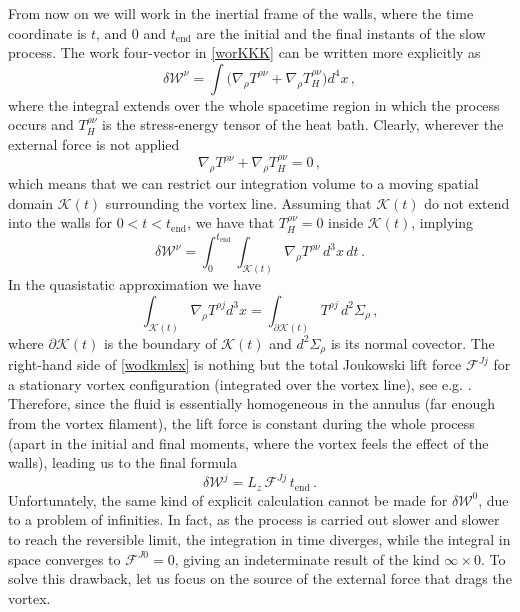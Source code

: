 \documentclass[preprints,article,accept,moreauthors,pdftex]{mdpi}
\begin{document}
From now on we will work in the inertial frame of the walls, where the time coordinate is $t$, 
and  $0$ and $t_{\text{end}}$ are the initial and the final instants of the slow process.
The work four-vector in  \eqref{worKKK} can be written more explicitly as
\begin{equation}
\delta \mathcal{W}^\nu = \int \bigg( \nabla_\rho T^{\rho \nu}+ \nabla_\rho T^{\rho \nu}_H \bigg) d^4 x
\, ,
\end{equation}
where the integral extends over the whole spacetime region in which the process occurs and $T^{\rho \nu}_H$ is the stress-energy tensor of the heat bath. 
Clearly, wherever the external force is not applied
\begin{equation}
\nabla_\rho T^{\rho \nu}+ \nabla_\rho T^{\rho \nu}_H  =0 \, ,
\end{equation}
which means that we can restrict our integration volume to a moving spatial domain $\mathcal{K}(t)$ surrounding the vortex line. 
Assuming that $\mathcal{K}(t)$ do not extend into the walls for $0<t<t_{\text{end}}$, we have that $T^{\rho \nu}_H=0$ inside $\mathcal{K}(t)$, implying
\begin{equation}
\delta \mathcal{W}^\nu = \int_0^{t_{\text{end}}} \int_{\mathcal{K}(t)} \nabla_\rho T^{\rho \nu}
\,  d^3 x \, dt \, . 
\end{equation}
In the quasistatic approximation we have
\begin{equation}\label{wodkmlsx}
\int_{\mathcal{K}(t)} \nabla_\rho T^{\rho j} d^3 x = \int_{\partial \mathcal{K}(t)}  T^{\rho j} 
\, d^2 \Sigma_\rho \, ,
\end{equation} 
where $\partial \mathcal{K}(t)$ is the boundary of $\mathcal{K}(t)$ and $d^2 \Sigma_\rho$ is its normal covector.  
The right-hand side of \eqref{wodkmlsx} is nothing but the total  Joukowski lift force $\mathcal{F}^{Jj}$ for a stationary vortex configuration (integrated over the vortex line), see e.g. \cite{Carter_Prix_Magnus}. 
Therefore, since the fluid is essentially homogeneous in the annulus (far enough from the vortex filament), the lift force is constant during the whole process (apart in the initial and final moments, where the vortex feels the effect of the walls), leading us to the final formula
\begin{equation}
\delta \mathcal{W}^j =L_z \, \mathcal{F}^{Jj} \, t_{\text{end}} \, .
\end{equation}
Unfortunately, the same kind of explicit calculation cannot be made for $\delta \mathcal{W}^0$, due to a problem of infinities. In fact, as the process is carried out slower and slower to reach the reversible limit, the integration in time diverges, while the integral in space converges to $\mathcal{F}^{J0} =0$, giving an indeterminate result of the kind $ \infty \times 0$. 
To solve this drawback, let us focus on the source of the external force that drags the vortex. 
\end{document}
